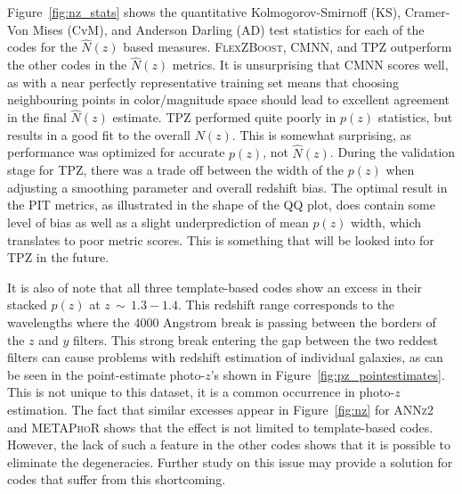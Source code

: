 Figure~\ref{fig:nz_stats} shows the quantitative Kolmogorov-Smirnoff (KS), Cramer-Von Mises (CvM), and Anderson Darling (AD) test statistics for each of the codes for the $\hat{N}(z)$ based measures.
\textsc{FlexZBoost}, \textsc{CMNN}, and \textsc{TPZ} outperform the other codes in the $\hat{N}(z)$ metrics.
It is unsurprising that \textsc{CMNN} scores well, as with a near perfectly representative training set means that choosing neighbouring points in color/magnitude space should lead to excellent agreement in the final $\hat{N}(z)$ estimate.  \textsc{TPZ} performed quite poorly in $p(z)$ statistics, but results in a good fit to the overall $N(z)$.  This is somewhat surprising, as performance was optimized for accurate $p(z)$, not $\hat{N}(z)$.  During the validation stage for \textsc{TPZ}, there was a trade off between the width of the $p(z)$ when adjusting a smoothing parameter and overall redshift bias.  The optimal result in the PIT metrics, as illustrated in the shape of the QQ plot, does contain some level of bias as well as a slight underprediction of mean $p(z)$ width, which translates to poor metric scores.  This is something that will be looked into for \textsc{TPZ} in the future.

It is also of note that all three template-based codes show an excess in their stacked $p(z)$ at $z\,\sim\,1.3-1.4$.  This redshift range corresponds to the wavelengths where the $4000$ Angstrom break is passing between the borders of the $z$ and $y$ filters.  This strong break entering the gap between the two reddest filters can cause problems with redshift estimation of individual galaxies, as can be seen in the point-estimate photo-$z$'s shown in Figure~\ref{fig:pz_pointestimates}.  This is not unique to this dataset, it is a common occurrence in photo-$z$ estimation.  The fact that similar excesses appear in Figure~\ref{fig:nz} for \textsc{ANNz2} and \textsc{METAPhoR} shows that the effect is not limited to template-based codes.  However, the lack of such a feature in the other codes shows that it is possible to eliminate the degeneracies.  Further study on this issue may provide a solution for codes that suffer from this shortcoming.




